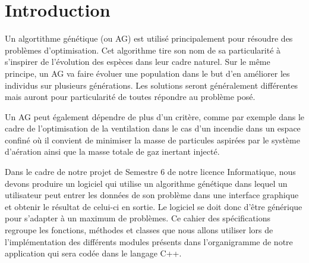 \documentclass[a4paper,11pt]{article}
\title{\vspace{13em}{\huge Cahier des Spécifications}}
\author{Edouard Fouassier - Maxime Gonthier - Benjamin Guillot\\
		Laureline Martin - Rémi Navarro - Lydia Rodrigez de la Nava
		\vspace{2em}\\
		Algorithme Génétique
		\vspace{2em}}
\begin{document}
	
	\clearpage
	\maketitle\vspace{13em}
\newpage
\tableofcontents
\newpage\clearpage{}
	
	\section{Introduction}
		Un algortithme génétique (ou AG) est utilisé principalement pour résoudre des problèmes d’optimisation. 
		Cet algorithme tire son nom de sa particularité à s’inspirer de l’évolution des espèces dans leur cadre naturel.
		Sur le même principe, un AG va faire évoluer une population dans le but d’en améliorer les individus sur plusieurs générations.
		Les solutions seront généralement différentes mais auront pour particularité de toutes répondre au problème posé.

		Un AG peut également dépendre de plus d'un critère, comme par exemple dans le cadre de l'optimisation de la ventilation dans le cas d’un incendie dans un espace confiné où il convient de minimiser la masse de particules aspirées par le système d'aération ainsi que la masse totale de gaz inertant injecté.

		Dans le cadre de notre projet de Semestre 6 de notre licence Informatique, nous devons produire un logiciel qui utilise un algorithme génétique dans lequel un utilisateur peut entrer les données de son problème dans une interface graphique et obtenir le résultat de celui-ci en sortie. Le logiciel se doit donc d'être générique pour s'adapter à un maximum de problèmes.
		Ce cahier des spécifications regroupe les fonctions, méthodes et classes que nous allons utiliser lors de l’implémentation des différents modules présents dans l'organigramme de notre application qui sera codée dans le langage C++.
\end{document}
